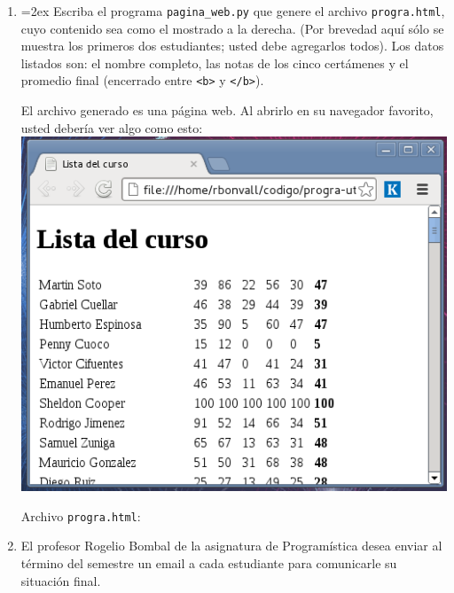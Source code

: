\documentclass[12pt,spanish]{article}
\begin{document}
  \begin{enumerate}[leftmargin=0pt]

    \item
      \begin{minipage}[t]{.5\textwidth}
        \parskip=2ex
        Escriba el programa \texttt{pagina\_web.py}
        que genere el archivo \texttt{progra.html},
        cuyo contenido sea como el mostrado a la derecha.
        (Por brevedad aquí sólo se muestra los primeros dos estudiantes;
        usted debe agregarlos todos).
        Los datos listados son:
        el nombre completo,
        las notas de los cinco certámenes
        y el promedio final (encerrado entre \verb+<b>+ y \verb+</b>+).

        El archivo generado es una página web.
        Al abrirlo en su navegador favorito,
        usted debería ver algo como esto:
        \includegraphics[width=\textwidth]{pagina.png}

      \end{minipage}
      \hfill
      \begin{minipage}[t]{.45\textwidth}
        Archivo \texttt{progra.html}:
        
      \end{minipage}

    \newpage
    \item
      El profesor Rogelio Bombal de la asignatura de Programística
      desea enviar al término del semestre
      un email a cada estudiante para comunicarle su situación final.


\end{enumerate}
\end{document}
